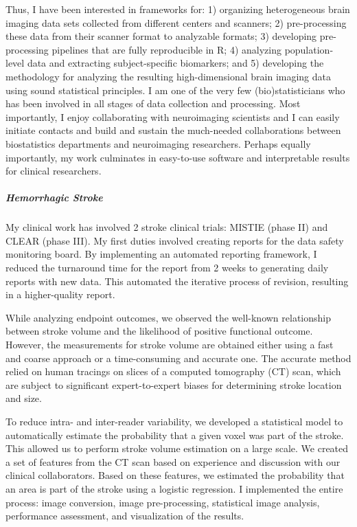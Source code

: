 \documentclass[12pt,a4paper]{article}
\begin{document}
Thus, I have been interested in frameworks for: 1) organizing heterogeneous brain imaging data sets collected from different centers and scanners; 2) pre-processing these data from their scanner format to analyzable formats; 3) developing pre-processing pipelines that are fully reproducible in R; 4) analyzing population-level data and extracting subject-specific biomarkers; and 5) developing the methodology for analyzing the resulting high-dimensional brain imaging data using sound statistical principles. I am one of the very few (bio)statisticians who has been involved in all stages of data collection and processing. Most importantly, I enjoy collaborating with neuroimaging scientists and I can easily initiate contacts and build and sustain the much-needed collaborations between biostatistics departments and neuroimaging researchers. Perhaps equally importantly, my work culminates in easy-to-use software and interpretable results for clinical researchers.

\vspace{-1em}
\subparagraph{Hemorrhagic Stroke} My clinical work has involved 2 stroke clinical trials: MISTIE (phase II) and CLEAR (phase III).  My first duties involved creating reports for the data safety monitoring board.  By implementing an automated reporting framework, I reduced the turnaround time for the report from 2 weeks to generating daily reports with new data.  This automated the iterative process of revision, resulting in a higher-quality report.  

While analyzing endpoint outcomes, we observed the well-known relationship between stroke volume and the likelihood of positive functional outcome.  However, the measurements for stroke volume are obtained either using a fast and coarse approach or a time-consuming and accurate one.  The accurate method relied on human tracings on slices of a computed tomography (CT) scan, which are subject to significant expert-to-expert biases for determining stroke location and size.  

To reduce intra- and inter-reader variability, we developed a statistical model to automatically estimate the probability that a given voxel was part of the stroke.  This allowed us to perform stroke volume estimation on a large scale.  We created a set of features from the CT scan based on experience and discussion with our clinical collaborators.  Based on these features, we estimated the probability that an area is part of the stroke using a logistic regression.  I implemented the entire process: image conversion, image pre-processing, statistical image analysis, performance assessment, and visualization of the results.  
\end{document}
